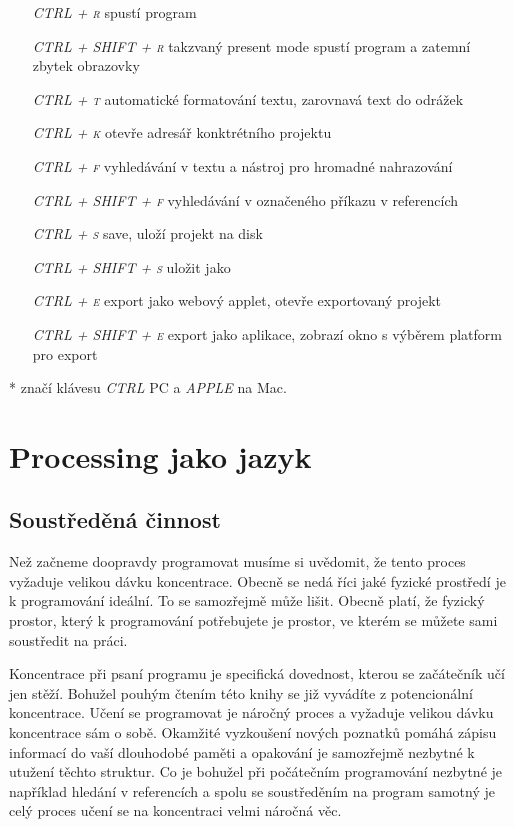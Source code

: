 \documentclass[10pt]{book}
\newcommand{\oddil}[1]{\section{#1}\index{#1}\label{#1}}
\newcommand{\klavesy}[1]{\textsc{\em #1}}
\begin{document}
\begin{itemize}
\item[\klavesy{CTRL + r}]  spustí program
\item[\klavesy{CTRL + SHIFT + r}] takzvaný present mode spustí program a zatemní zbytek obrazovky
\item[\klavesy{CTRL + t}] automatické formatování textu, zarovnavá text do odrážek
\item[\klavesy{CTRL + k}] otevře adresář konktrétního projektu
\item[\klavesy{CTRL + f}] vyhledávání v textu a nástroj pro hromadné nahrazování
\item[\klavesy{CTRL + SHIFT + f}] vyhledávání v označeného příkazu v referencích
\item[\klavesy{CTRL + s}] save, uloží projekt na disk
\item[\klavesy{CTRL + SHIFT + s}] uložit jako

\item[\klavesy{CTRL + e}] export jako webový applet, otevře exportovaný projekt
\item[\klavesy{CTRL + SHIFT + e}] export jako aplikace, zobrazí okno s výběrem platform pro export

\end{itemize}

* značí klávesu \klavesy{CTRL} PC a \klavesy{APPLE} na Mac.


\chapter{Processing jako jazyk}

\oddil{Soustředěná činnost}

Než začneme doopravdy programovat musíme si uvědomit, že tento proces vyžaduje velikou dávku koncentrace. Obecně se nedá říci jaké fyzické prostředí je k programování ideální. To se samozřejmě může lišit. Obecně platí, že fyzický prostor, který k programování potřebujete je prostor, ve kterém se můžete sami soustředit na práci.

Koncentrace při psaní programu je specifická dovednost, kterou se začátečník učí jen stěží. Bohužel pouhým čtením této knihy se již vyvádíte z potencionální koncentrace. Učení se programovat je náročný proces a vyžaduje velikou dávku koncentrace sám o sobě. Okamžité vyzkoušení nových poznatků pomáhá zápisu informací do vaší dlouhodobé paměti a opakování je samozřejmě nezbytné k utužení těchto struktur. Co je bohužel při počátečním programování nezbytné je například hledání v referencích a spolu se soustředěním na program samotný je celý proces učení se na koncentraci velmi náročná věc.
\end{document}
